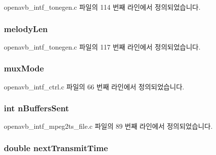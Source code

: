 openavb\+\_\+intf\+\_\+tonegen.\+c 파일의 114 번째 라인에서 정의되었습니다.

\subsubsection[{\texorpdfstring{melody\+Len}{melodyLen}}]{ melody\+Len}\hypertarget{structpvt__data__t_a8a601d1e0523a72fef56a827cf93dd77}{}\label{structpvt__data__t_a8a601d1e0523a72fef56a827cf93dd77}


openavb\+\_\+intf\+\_\+tonegen.\+c 파일의 117 번째 라인에서 정의되었습니다.

\subsubsection[{\texorpdfstring{mux\+Mode}{muxMode}}]{ mux\+Mode}\hypertarget{structpvt__data__t_ae65ed8a522032060bb4b0f64cb4a99f0}{}\label{structpvt__data__t_ae65ed8a522032060bb4b0f64cb4a99f0}


openavb\+\_\+intf\+\_\+ctrl.\+c 파일의 66 번째 라인에서 정의되었습니다.

\subsubsection[{\texorpdfstring{n\+Buffers\+Sent}{nBuffersSent}}]{\setlength{\rightskip}{0pt plus 5cm}int n\+Buffers\+Sent}\hypertarget{structpvt__data__t_aca1546342cf15dde023a7e9fbda1366e}{}\label{structpvt__data__t_aca1546342cf15dde023a7e9fbda1366e}


openavb\+\_\+intf\+\_\+mpeg2ts\+\_\+file.\+c 파일의 89 번째 라인에서 정의되었습니다.

\subsubsection[{\texorpdfstring{next\+Transmit\+Time}{nextTransmitTime}}]{\setlength{\rightskip}{0pt plus 5cm}double next\+Transmit\+Time}\hypertarget{structpvt__data__t_a29614099200d849756097092eb31e084}{}\label{structpvt__data__t_a29614099200d849756097092eb31e084}


